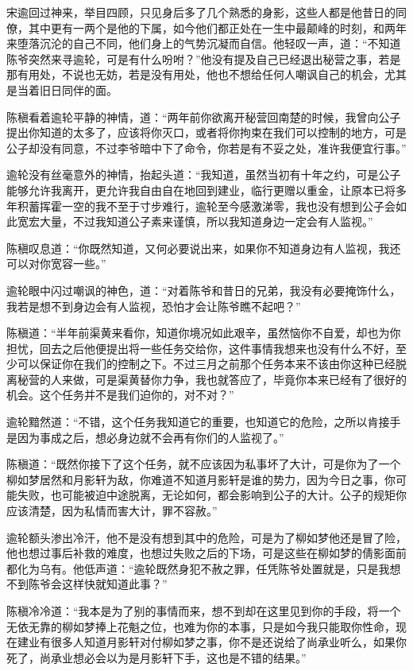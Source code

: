 宋逾回过神来，举目四顾，只见身后多了几个熟悉的身影，这些人都是他昔日的同僚，其中更有一两个是他的下属，如今他们都正处在一生中最颠峰的时刻，和两年来堕落沉沦的自己不同，他们身上的气势沉凝而自信。他轻叹一声，道：“不知道陈爷突然来寻逾轮，可是有什么吩咐？”他没有提及自己已经退出秘营之事，若是那有用处，不说也无妨，若是没有用处，他也不想给任何人嘲讽自己的机会，尤其是当着旧日同伴的面。

陈稹看着逾轮平静的神情，道：“两年前你欲离开秘营回南楚的时候，我曾向公子提出你知道的太多了，应该将你灭口，或者将你拘束在我们可以控制的地方，可是公子却没有同意，不过李爷暗中下了命令，你若是有不妥之处，准许我便宜行事。”

逾轮没有丝毫意外的神情，抬起头道：“我知道，虽然当初有十年之约，可是公子能够允许我离开，更允许我自由自在地回到建业，临行更赠以重金，让原本已将多年积蓄挥霍一空的我不至于寸步难行，逾轮至今感激涕零，我也没有想到公子会如此宽宏大量，不过我知道公子素来谨慎，所以我知道身边一定会有人监视。”

陈稹叹息道：“你既然知道，又何必要说出来，如果你不知道身边有人监视，我还可以对你宽容一些。”

逾轮眼中闪过嘲讽的神色，道：“对着陈爷和昔日的兄弟，我没有必要掩饰什么，我若是想不到身边会有人监视，恐怕才会让陈爷瞧不起吧？”

陈稹道：“半年前渠黄来看你，知道你境况如此艰辛，虽然恼你不自爱，却也为你担忧，回去之后他便提出将一些任务交给你，这件事情我想来也没有什么不好，至少可以保证你在我们的控制之下。不过三月之前那个任务本来不该由你这种已经脱离秘营的人来做，可是渠黄替你力争，我也就答应了，毕竟你本来已经有了很好的机会。这个任务并不是我们迫你的，对不对？”

逾轮黯然道：“不错，这个任务我知道它的重要，也知道它的危险，之所以肯接手是因为事成之后，想必身边就不会再有你们的人监视了。”

陈稹道：“既然你接下了这个任务，就不应该因为私事坏了大计，可是你为了一个柳如梦居然和月影轩为敌，你难道不知道月影轩是谁的势力，因为今日之事，你可能失败，也可能被迫中途脱离，无论如何，都会影响到公子的大计。公子的规矩你应该清楚，因为私情而害大计，罪不容赦。”

逾轮额头渗出冷汗，他不是没有想到其中的危险，可是为了柳如梦他还是冒了险，他也想过事后补救的难度，也想过失败之后的下场，可是这些在柳如梦的倩影面前都化为乌有。他低声道：“逾轮既然身犯不赦之罪，任凭陈爷处置就是，只是我想不到陈爷会这样快就知道此事？”

陈稹冷冷道：“我本是为了别的事情而来，想不到却在这里见到你的手段，将一个无依无靠的柳如梦捧上花魁之位，也难为你的本事，只是如今我只能取你性命，现在建业有很多人知道月影轩对付柳如梦之事，你不是还说给了尚承业听么，如果你死了，尚承业想必会以为是月影轩下手，这也是不错的结果。”

